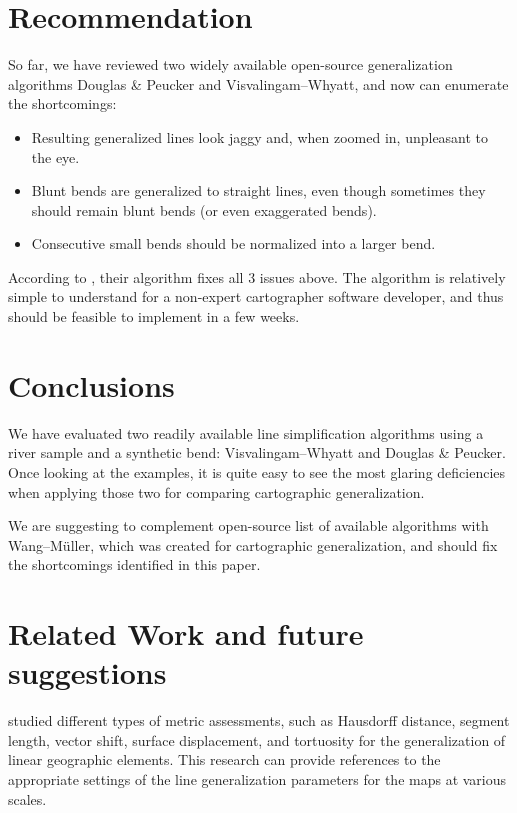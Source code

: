 \documentclass[a4paper]{article}
\newcommand{\DP}{Douglas \& Peucker}
\newcommand{\VW}{Visvalingam--Whyatt}
\newcommand{\WM}{Wang--M{\"u}ller}
\begin{document}
\section{Recommendation}
\label{sec:recommendation}

So far, we have reviewed two widely available open-source generalization
algorithms {\DP} and {\VW}, and now can enumerate the shortcomings:
\begin{itemize}
    \item Resulting generalized lines look jaggy and, when zoomed in,
        unpleasant to the eye.
    \item Blunt bends are generalized to straight lines, even though sometimes
        they should remain blunt bends (or even exaggerated bends).
    \item Consecutive small bends should be normalized into a larger bend.
\end{itemize}

According to \cite{wang1998line}, their algorithm fixes all 3 issues above. The
algorithm is relatively simple to understand for a non-expert cartographer
software developer, and thus should be feasible to implement in a few weeks.

\section{Conclusions}
\label{sec:conclusions}

We have evaluated two readily available line simplification algorithms using a
river sample and a synthetic bend: {\VW} and {\DP}. Once looking at the
examples, it is quite easy to see the most glaring deficiencies when applying
those two for comparing cartographic generalization.

We are suggesting to complement open-source list of
available algorithms with {\WM}, which was created for cartographic
generalization, and should fix the shortcomings identified in this paper.

\section{Related Work and future suggestions}
\label{sec:related_work}

\cite{stanislawski2012automated} studied different types of metric assessments,
such as Hausdorff distance, segment length, vector shift, surface displacement,
and tortuosity for the generalization of linear geographic elements. This
research can provide references to the appropriate settings of the line
generalization parameters for the maps at various scales.
\end{document}
